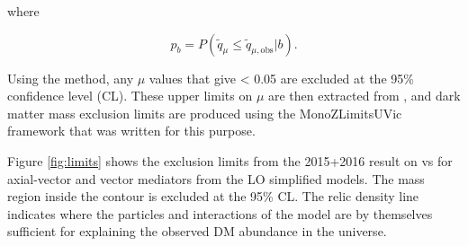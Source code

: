 \noindent where 

\begin{equation}
p_b = P(\tilde q_\mu \leq \tilde{q}_{\mu,\text{obs}} | b).
\end{equation}

Using the \cls method, any $\mu$ values that give \cls < 0.05 are excluded at the 95\% confidence level (CL). These upper limits on $\mu$ are then extracted from \histfitter, and dark matter mass exclusion limits are produced using the MonoZLimitsUVic framework that was written for this purpose.

Figure \ref{fig:limits} shows the exclusion limits from the 2015+2016 result on \mchi vs \mmed for axial-vector and vector mediators from the LO simplified models. The mass region inside the contour is excluded at the 95\% CL. The relic density line indicates where the particles and interactions of the model are by themselves sufficient for explaining the observed DM abundance in the universe.

